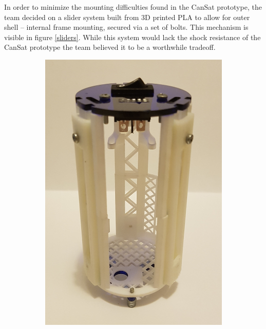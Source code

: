 \documentclass[]{report}
\begin{document}
In order to minimize the mounting difficulties found in the CanSat prototype, the team decided on a slider system built from 3D printed PLA to allow for outer shell – internal frame mounting, secured via a set of bolts. This mechanism is visible in figure \ref{sliders}. While this system would lack the shock resistance of the CanSat prototype the team believed it to be a worthwhile tradeoff. 

\begin{figure}
	\centering
	\begin{subfigure}{.5\textwidth}
		\centering
		\includegraphics[width=.7\linewidth]{bareframe.jpg}
	\end{subfigure}%
	\begin{subfigure}{.5\textwidth}
		\centering

\end{subfigure}
\end{figure}
\end{document}
